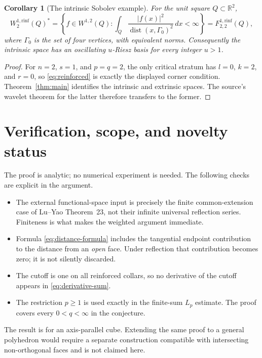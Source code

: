 \documentclass[11pt]{article}
\newtheorem{corollary}[theorem]{Corollary}
\newcommand{\R}{\mathbb R}
\newcommand{\dist}{\operatorname{dist}}
\newcommand{\rinf}{\mathrm{rinf}}
\begin{document}
\begin{corollary}[The intrinsic Sobolev example]\label{cor:sobolev}
For the unit square $Q\subset\R^2$,
\[
 W_2^{1,\rinf}(Q)^*
 =\left\{f\in W^{1,2}(Q):
   \int_Q\frac{|f(x)|^2}{\dist(x,\Gamma_0)^2}\,dx<\infty\right\}
 =F_{2,2}^{1,\rinf}(Q),
\]
where $\Gamma_0$ is the set of four vertices, with equivalent norms.
Consequently the intrinsic space has an oscillating $u$-Riesz basis for
every integer $u>1$.
\end{corollary}

\begin{proof}
For $n=2$, $s=1$, and $p=q=2$, the only critical stratum has $l=0$,
$k=2$, and $r=0$, so \eqref{eq:reinforced} is exactly the displayed corner
condition.  Theorem~\ref{thm:main} identifies the intrinsic and extrinsic
spaces.  The source's wavelet theorem for the latter therefore transfers
to the former.
\end{proof}

\section{Verification, scope, and novelty status}

The proof is analytic; no numerical experiment is needed.  The following
checks are explicit in the argument.
\begin{itemize}[leftmargin=*]
 \item The external functional-space input is precisely the finite
 common-extension case of Lu--Yao Theorem~23, not their infinite universal
 reflection series.  Finiteness is what makes the weighted argument
 immediate.
 \item Formula \eqref{eq:distance-formula} includes the tangential endpoint
 contribution to the distance from an \emph{open} face.  Under reflection
 that contribution becomes zero; it is not silently discarded.
 \item The cutoff is one on all reinforced collars, so no derivative of the
 cutoff appears in \eqref{eq:derivative-sum}.
 \item The restriction $p\ge1$ is used exactly in the finite-sum $L_p$
 estimate.  The proof covers every $0<q<\infty$ in the conjecture.
\end{itemize}

The result is for an axis-parallel cube.  Extending the same proof to a
general polyhedron would require a separate construction compatible with
intersecting non-orthogonal faces and is not claimed here.
\end{document}
